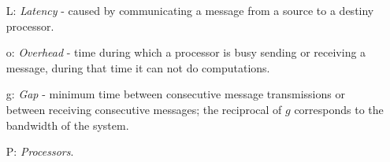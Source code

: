 \begin{itemize}
\item[L:] \textit{Latency} - caused by communicating a message from a source to a destiny processor.
\item[o:] \textit{Overhead} - time during which a processor is busy sending or receiving a message, during that time it can not do
computations.
\item[g:] \textit{Gap} - minimum time between consecutive message transmissions or between receiving consecutive messages; the reciprocal of $g$ corresponds to the bandwidth of the system.
\item[P:] \textit{Processors}.
\end{itemize}

